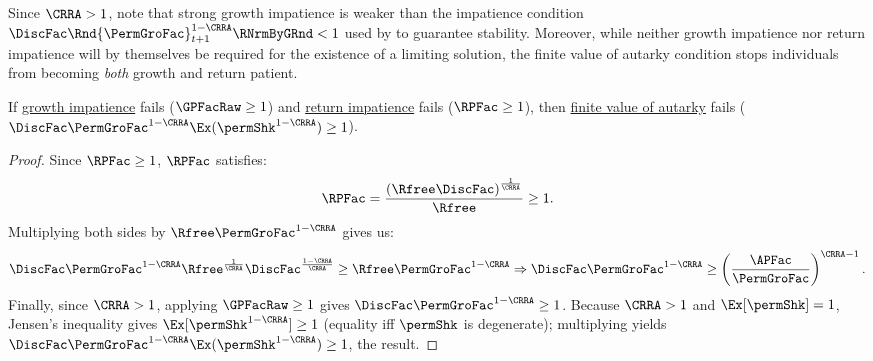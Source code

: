 \documentclass[\econtexRoot/BufferStockTheory]{subfiles}
\begin{document}

Since $\CRRA>1$, note that strong growth impatience is weaker than the impatience condition $\DiscFac \Rnd{\PermGroFac}_{t+1}^{1-\CRRA}\RNrmByGRnd<1$ used by \cite{mstIncFluct} to guarantee stability. Moreover, while neither growth impatience nor return impatience will by themselves be required for the existence of a limiting solution, the finite value of autarky condition stops individuals from becoming \textit{both} growth and return patient.

\hypertarget{VAFacDefn}{}
\begin{claim}\label{claim:noRICGIC}
If \hyperlink{GICRaw}{growth impatience} fails ($\GPFacRaw  \geq 1$) and \hyperlink{RIC}{return impatience} fails ($\RPFac \geq 1$), then \hyperlink{FVAC}{finite value of autarky} fails ($\DiscFac \PermGroFac^{1-\CRRA}\Ex(\permShk^{1-\CRRA})\geq 1$).
\end{claim}

\begin{proof}
Since $\RPFac  \geq 1$, $\RPFac $ satisfies:
%
%
\begin{equation}
\RPFac = \frac{\left(\Rfree\DiscFac\right)^{\frac{1}{\CRRA}}}{\Rfree}\geq 1.
\end{equation}
%
Multiplying both sides by $\Rfree\PermGroFac^{1-\CRRA}$ gives us:
%
\begin{equation}
\DiscFac\PermGroFac^{1-\CRRA}\Rfree^{\frac{1}{\CRRA}}\DiscFac^{\frac{1-\CRRA}{\CRRA}}{}\geq\Rfree \PermGroFac^{1-\CRRA} \Rightarrow \DiscFac\PermGroFac^{1-\CRRA}\geq\left(\frac{\APFac}{\PermGroFac}\right)^{\CRRA-1}.
\end{equation}
%
Finally, since $\CRRA>1$, applying $\GPFacRaw  \geq 1$ gives $\DiscFac\PermGroFac^{1-\CRRA}\geq 1$.
Because $\CRRA>1$ and $\Ex[\permShk]=1$, Jensen's inequality gives $\Ex[\permShk^{1-\CRRA}]\geq 1$ (equality iff $\permShk$ is degenerate); multiplying yields $\DiscFac\PermGroFac^{1-\CRRA}\Ex(\permShk^{1-\CRRA})\geq 1$, the result.

\end{proof}
\end{document}
